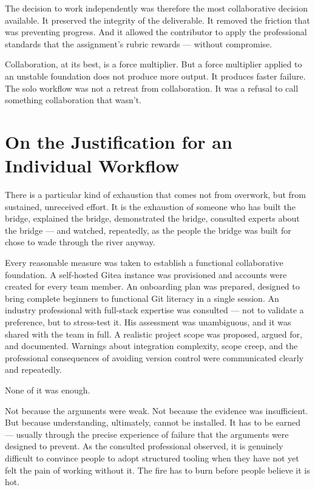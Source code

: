 \documentclass[11pt,a4paper]{book}
\begin{document}
The decision to work independently was therefore the most collaborative decision available. It preserved the integrity of the deliverable. It removed the friction that was preventing progress. And it allowed the contributor to apply the professional standards that the assignment's rubric rewards --- without compromise.
 
Collaboration, at its best, is a force multiplier. But a force multiplier applied to an unstable foundation does not produce more output. It produces faster failure. The solo workflow was not a retreat from collaboration. It was a refusal to call something collaboration that wasn't.
 
\section{On the Justification for an Individual Workflow}
 
There is a particular kind of exhaustion that comes not from overwork, but from sustained, unreceived effort. It is the exhaustion of someone who has built the bridge, explained the bridge, demonstrated the bridge, consulted experts about the bridge --- and watched, repeatedly, as the people the bridge was built for chose to wade through the river anyway.
 
Every reasonable measure was taken to establish a functional collaborative foundation. A self-hosted Gitea instance was provisioned and accounts were created for every team member. An onboarding plan was prepared, designed to bring complete beginners to functional Git literacy in a single session. An industry professional with full-stack expertise was consulted --- not to validate a preference, but to stress-test it. His assessment was unambiguous, and it was shared with the team in full. A realistic project scope was proposed, argued for, and documented. Warnings about integration complexity, scope creep, and the professional consequences of avoiding version control were communicated clearly and repeatedly.
 
None of it was enough.
 
Not because the arguments were weak. Not because the evidence was insufficient. But because understanding, ultimately, cannot be installed. It has to be earned --- usually through the precise experience of failure that the arguments were designed to prevent. As the consulted professional observed, it is genuinely difficult to convince people to adopt structured tooling when they have not yet felt the pain of working without it. The fire has to burn before people believe it is hot.
 
\end{document}
